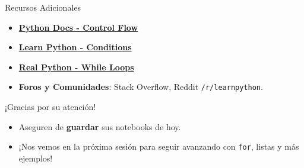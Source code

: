 \documentclass[10pt]{beamer}
\begin{document}
\begin{frame}{Recursos Adicionales}
  \begin{itemize}
    \item \href{https://docs.python.org/3/tutorial/controlflow.html}{\textbf{Python Docs - Control Flow}}
    \item \href{https://www.learnpython.org/en/Conditions}{\textbf{Learn Python - Conditions}}
    \item \href{https://realpython.com/python-while-loop/}{\textbf{Real Python - While Loops}}
    \item \textbf{Foros y Comunidades}: Stack Overflow, Reddit \texttt{/r/learnpython}.
  \end{itemize}
\end{frame}

\begin{frame}
  \Huge{\centerline{¡Gracias por su atención!}}
  \vspace{0.4cm}
  \normalsize
  \begin{itemize}
    \item Aseguren de \textbf{guardar} sus notebooks de hoy.
    \item ¡Nos vemos en la próxima sesión para seguir avanzando con \texttt{for}, listas y más ejemplos!
  \end{itemize}
\end{frame}
\end{document}
